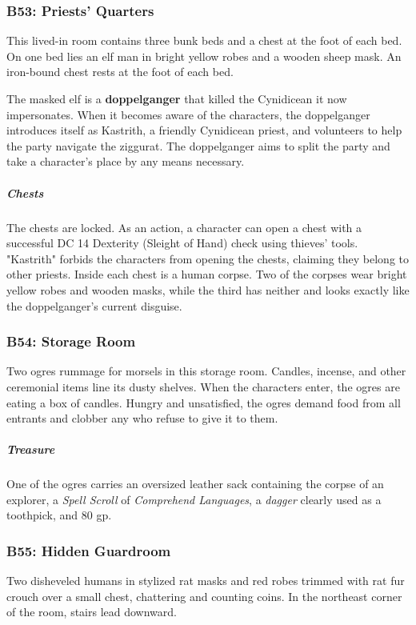 \documentclass[10pt,a4paper,twoside,bg=print,twocolumn,openany,nodeprecatedcode]{dndbook}
\begin{document}
\subsubsection{B53: Priests' Quarters}
\begin{DndReadAloud}{}
This lived-in room contains three bunk beds and a chest at the foot of each bed. On one bed lies an elf man in bright yellow robes and a wooden sheep mask. An iron-bound chest rests at the foot of each bed.

\end{DndReadAloud}

The masked elf is a \textbf{doppelganger} that killed the Cynidicean it now impersonates. When it becomes aware of the characters, the doppelganger introduces itself as Kastrith, a friendly Cynidicean priest, and volunteers to help the party navigate the ziggurat. The doppelganger aims to split the party and take a character's place by any means necessary.

\subparagraph{Chests}
The chests are locked. As an action, a character can open a chest with a successful DC 14 Dexterity (Sleight of Hand) check using thieves' tools. "Kastrith" forbids the characters from opening the chests, claiming they belong to other priests. Inside each chest is a human corpse. Two of the corpses wear bright yellow robes and wooden masks, while the third has neither and looks exactly like the doppelganger's current disguise.

\subsubsection{B54: Storage Room}
Two ogres rummage for morsels in this storage room. Candles, incense, and other ceremonial items line its dusty shelves. When the characters enter, the ogres are eating a box of candles. Hungry and unsatisfied, the ogres demand food from all entrants and clobber any who refuse to give it to them.

\subparagraph{Treasure}
One of the ogres carries an oversized leather sack containing the corpse of an explorer, a \textit{Spell Scroll} of \textit{Comprehend Languages}, a \textit{dagger} clearly used as a toothpick, and 80 gp.

\subsubsection{B55: Hidden Guardroom}
\begin{DndReadAloud}{}
Two disheveled humans in stylized rat masks and red robes trimmed with rat fur crouch over a small chest, chattering and counting coins. In the northeast corner of the room, stairs lead downward.

\end{DndReadAloud}
\end{document}
